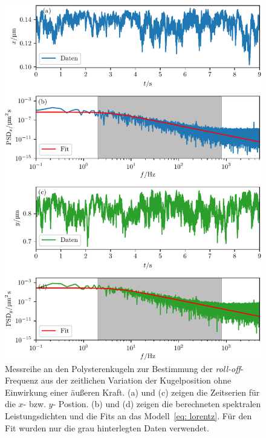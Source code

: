 \begin{figure}
  \centering
  \includegraphics[scale = 1]{../analysis/data/i_quarz/70mA/results/without_force_70mA.pdf}
  \caption{Messreihe an den Polysterenkugeln zur Bestimmung der \emph{roll-off}-Frequenz aus der zeitlichen Variation der Kugelposition ohne Einwirkung einer äußeren Kraft.
  (a) und (c) zeigen die Zeitserien für die $x$- bzw. $y$- Postion. (b) und (d) zeigen die berechneten spektralen Leistungsdichten und die Fits an das
  Modell~\eqref{eq: lorentz}. Für den Fit wurden nur die grau hinterlegten Daten verwendet.}
  \label{fig: poly_without_force}
\end{figure}
